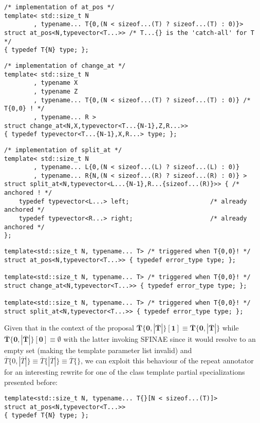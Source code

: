 \documentclass[ notitlepage
              , a4paper
              , twoside ]{article}
\newcommand{\parnum}{\bfseries\arabic{parcount}}
\newcounter{parcount}
\newcommand\p{%
    \stepcounter{parcount}%
    \leavevmode\marginpar[\hfill\parnum]{\parnum}%
}
\begin{document}
\begin{verbatim}
/* implementation of at_pos */
template< std::size_t N
        , typename... T{0,(N < sizeof...(T) ? sizeof...(T) : 0)}>
struct at_pos<N,typevector<T...>> /* T...{} is the 'catch-all' for T */
{ typedef T{N} type; };
\end{verbatim}

\begin{verbatim}
/* implementation of change_at */
template< std::size_t N
        , typename X
        , typename Z
        , typename... T{0,(N < sizeof...(T) ? sizeof...(T) : 0)} /* T{0,0} ! */
        , typename... R >
struct change_at<N,X,typevector<T...{N-1},Z,R...>>
{ typedef typevector<T...{N-1},X,R...> type; };
\end{verbatim}

\begin{verbatim}
/* implementation of split_at */
template< std::size_t N
        , typename... L{0,(N < sizeof...(L) ? sizeof...(L) : 0)}
        , typename... R{N,(N < sizeof...(R) ? sizeof...(R) : 0)} >
struct split_at<N,typevector<L...{N-1},R...{sizeof...(R)}>> { /* anchored ! */
    typedef typevector<L...> left;                      /* already anchored */
    typedef typevector<R...> right;                     /* already anchored */
};
\end{verbatim}

\begin{verbatim}
template<std::size_t N, typename... T> /* triggered when T{0,0}! */
struct at_pos<N,typevector<T...>> { typedef error_type type; };

template<std::size_t N, typename... T> /* triggered when T{0,0}! */
struct change_at<N,typevector<T...>> { typedef error_type type; };

template<std::size_t N, typename... T> /* triggered when T{0,0}! */
struct split_at<N,typevector<T...>> { typedef error_type type; };

\end{verbatim}
\p Given that in the context of the proposal $\bm{\overline{T}\{0,|\overline{T}|\}[1] \equiv \overline{T}\{0,|\overline{T}|\}}$ while $\bm{\overline{T}\{0,|\overline{T}|\}[0] \equiv \emptyset{}}$ with the latter invoking SFINAE since it would resolve to an empty set (making the template parameter list invalid) and $\overline{T}\{0,|\overline{T}|\}\equiv{\overline{T}\{|\overline{T}|\}}\equiv{\overline{T}\{\}}$, we can exploit this behaviour of the repeat annotator for an interesting rewrite for one of the class template partial specializations presented before:
\begin{verbatim}
template<std::size_t N, typename... T{}[N < sizeof...(T)]>
struct at_pos<N,typevector<T...>>
{ typedef T{N} type; };
\end{verbatim}
\end{document}
